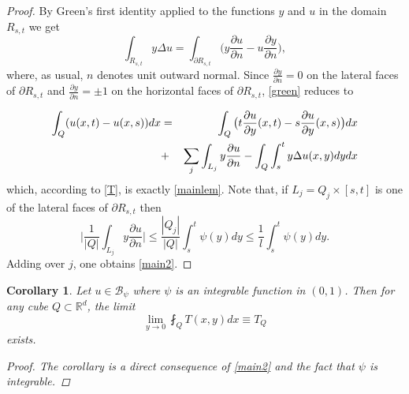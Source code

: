 \documentclass[11pt,letterpaper]{amsart}
\newtheorem{cor}{Corollary}[section]
\theoremstyle{definition}
\numberwithin{equation}{section}
\newcommand{\R}{\mathbb R}
\begin{document}
\begin{proof}
By Green's first identity applied to the functions $y$ and $u$ in the domain $R_{s,t}$ we get
\begin{equation}\label{green}
\int_{R_{s,t}} y \Delta u = \int_{\partial R_{s,t} } \big (  y \frac{\partial u}{\partial n} - u \frac{\partial y}{\partial n} \big ) , 
\end{equation}
where, as usual, $n$ denotes unit outward normal. Since $\displaystyle \frac{\partial y}{\partial n} = 0$ on the lateral faces of $\partial R_{s,t}$ and $\displaystyle \frac{\partial y}{\partial n} = \pm 1$ on the horizontal faces of $\partial R_{s,t}$, \eqref{green} reduces to

\begin{eqnarray*}
\int_{Q} (u(x,t) - u(x,s) ) dx  & = &
\displaystyle \int_{Q} \big ( t\frac{\partial u}{\partial y} (x,t) - s \frac{\partial u}{\partial y}(x,s) \big ) dx     \vspace{0.12cm}\\
& +  & \displaystyle  \sum_j \int_{L_j} y \frac{\partial u}{\partial n} - \int_{Q}\int_{s}^t  y \Delta u (x,y) dy dx
\end{eqnarray*}
 which, according to \eqref{T}, is exactly \eqref{mainlem}. Note that, if $L_j = Q_{j} \times [s,t]$ is one of the lateral faces of $\partial R_{s,t}$ then
$$
\Big | \frac{1}{|Q|}\int_{L_j} y \frac{\partial u}{\partial n} \Big | \leq \frac{|Q_j|}{|Q|} \int_{s}^t \psi(y) dy \leq \frac{1}{l}\int_{s}^t \psi(y) dy . 
$$
Adding over $j$, one obtains \eqref{main2}.
\end{proof}

\begin{cor}\label{cor2.1}
Let $u \in \mathcal{B}_{\psi}$ where $\psi$ is an integrable function in $(0,1)$. Then for any cube $Q \subset \R^d$, the limit
\begin{equation}\label{TQ}
\lim_{y\to 0} \fint_{Q} T(x,y) dx \equiv T_Q
\end{equation}
exists.

\begin{proof}
The corollary is a direct consequence of  \eqref{main2} and the fact that $\psi$ is integrable.
\end{proof}

\end{cor}
\end{document}

